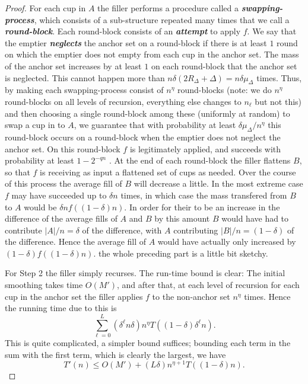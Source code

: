 \documentclass[twocolumn]{article}[10pt]
\newcommand{\defn}[1]{{\textit{\textbf{\boldmath #1}}}\xspace}
\begin{document}
\begin{proof}
  For each cup in $A$ the filler performs a procedure called a
  \defn{swapping-process}, which consists of a sub-structure repeated many
  times that we call a \defn{round-block}. Each round-block consists of an
  \defn{attempt} to apply $f$. We say that the emptier \defn{neglects} the
  anchor set on a round-block if there is at least $1$ round on which the
  emptier does not empty from each cup in the anchor set. The mass of the
  anchor set increases by at least $1$ on each round-block that the anchor set
  is neglected. This cannot happen more than $n\delta(2R_\Delta + \Delta) =
  n\delta\mu_\Delta$ times. Thus, by making each swapping-process consist of
  $n^{\eta}$ round-blocks (note: we do $n^{\eta}$ round-blocks on all levels of
  recursion, everything else changes to $n_\ell$ but not this) and then
  choosing a single round-block
  among these (uniformly at random) to swap a cup in to $A$, we guarantee that
  with probability at least $\delta\mu_\Delta/n^\eta$ this round-block occurs
  on a round-block when the emptier
  does not neglect the anchor set. On this round-block $f$ is legitimately
  applied, and succeeds with probability at least $1-2^{-qn}$ . At the end of
  each round-block the filler flattens $B$, so that $f$ is receiving as input a
  flattened set of cups as needed. Over the course of this process the average
  fill of $B$ will decrease a little. In the most extreme case $f$ may have
  succeeded up to $\delta n$ times, in which case the mass transfered from $B$
  to $A$ would be $\delta n f((1-\delta) n)$. In order for their to be an
  increase in the difference of the average fills of $A$ and $B$ by this amount
  $B$ would have had to contribute $|A|/n = \delta$ of the difference, with $A$
  contributing $|B|/n=(1-\delta)$ of the difference. Hence the average fill of
  $A$ would have actually only increased by $(1-\delta) f((1-\delta)n)$.
  {\color{red} the whole preceding part is a little bit sketchy.}

  For Step 2 the filler simply recurses. 
  The run-time bound is clear: The initial smoothing takes time $O(M')$, and
  after that, at each level of recursion for each cup in the anchor set the
  filler applies $f$ to the non-anchor set $n^\eta$ times. Hence the running
  time due to this is 
  $$\sum_{\ell=0}^L (\delta^\ell n\delta) n^\eta T((1-\delta)\delta^\ell n).$$
  This is quite complicated, a simpler bound suffices; bounding each term in
  the sum with the first term, which is clearly the largest, we have
  $$T'(n) \le O(M') + (L\delta)n^{\eta+1} T((1-\delta)n).$$


\end{proof}
\end{document}
